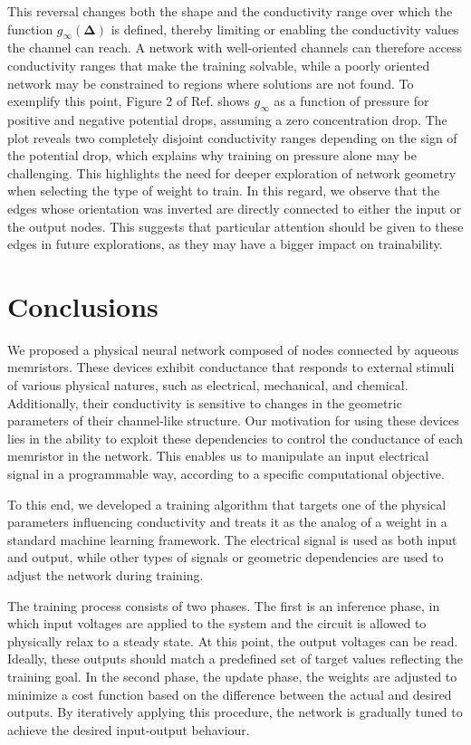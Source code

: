 \documentclass[reprint,superscriptaddress,prb,showkeys]{revtex4-2}
\begin{document}
This reversal changes both the shape and the conductivity range over which the function $g_{\infty}(\boldsymbol{\Delta})$ is defined, thereby limiting or enabling the conductivity values the channel can reach. A network with well-oriented channels can therefore access conductivity ranges that make the training solvable, while a poorly oriented network may be constrained to regions where solutions are not found. To exemplify this point, Figure 2 of Ref.\cite{Rene_PressureSensitive} shows $g_{\infty}$ as a function of pressure for positive and negative potential drops, assuming a zero concentration drop. The plot reveals two completely disjoint conductivity ranges depending on the sign of the potential drop, which explains why training on pressure alone may be challenging. This highlights the need for deeper exploration of network geometry when selecting the type of weight to train. In this regard, we observe that the edges whose orientation was inverted are directly connected to either the input or the output nodes. This suggests that particular attention should be given to these edges in future explorations, as they may have a bigger impact on trainability.

\section{\label{sec:concl}Conclusions}

We proposed a physical neural network composed of nodes connected by aqueous memristors. These devices exhibit conductance that responds to external stimuli of various physical natures, such as electrical, mechanical, and chemical. Additionally, their conductivity is sensitive to changes in the geometric parameters of their channel-like structure. Our motivation for using these devices lies in the ability to exploit these dependencies to control the conductance of each memristor in the network. This enables us to manipulate an input electrical signal in a programmable way, according to a specific computational objective.

To this end, we developed a training algorithm that targets one of the physical parameters influencing conductivity and treats it as the analog of a weight in a standard machine learning framework. The electrical signal is used as both input and output, while other types of signals or geometric dependencies are used to adjust the network during training.

The training process consists of two phases. The first is an inference phase, in which input voltages are applied to the system and the circuit is allowed to physically relax to a steady state. At this point, the output voltages can be read. Ideally, these outputs should match a predefined set of target values reflecting the training goal. In the second phase, the update phase, the weights are adjusted to minimize a cost function based on the difference between the actual and desired outputs. By iteratively applying this procedure, the network is gradually tuned to achieve the desired input-output behaviour.
\end{document}
